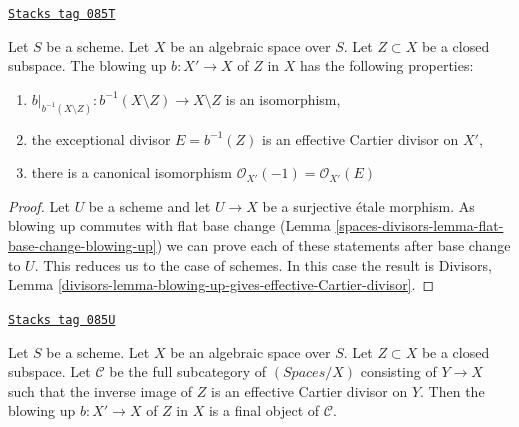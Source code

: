 \begin{lemma}
\label{spaces-divisors-lemma-blowing-up-gives-effective-Cartier-divisor}
\href{https://stacks.math.columbia.edu/tag/085T}{\texttt{Stacks tag 085T}}

Let $S$ be a scheme. Let $X$ be an algebraic space over $S$.
Let $Z \subset X$ be a closed subspace.
The blowing up $b : X' \to X$ of $Z$ in $X$
has the following properties:
\begin{enumerate}
\item $b|_{b^{-1}(X \setminus Z)} : b^{-1}(X \setminus Z) \to X \setminus Z$
is an isomorphism,
\item the exceptional divisor $E = b^{-1}(Z)$ is an effective Cartier divisor
on $X'$,
\item there is a canonical isomorphism
$\mathcal{O}_{X'}(-1) = \mathcal{O}_{X'}(E)$
\end{enumerate}
\end{lemma}

\begin{proof}
Let $U$ be a scheme and let $U \to X$ be a surjective \'etale morphism.
As blowing up commutes with flat base change
(Lemma \ref{spaces-divisors-lemma-flat-base-change-blowing-up})
we can prove each of these statements after base change to $U$.
This reduces us to the case of schemes.
In this case the result is
Divisors, Lemma
\ref{divisors-lemma-blowing-up-gives-effective-Cartier-divisor}.
\end{proof}

\begin{lemma}
\label{spaces-divisors-lemma-universal-property-blowing-up}
\href{https://stacks.math.columbia.edu/tag/085U}{\texttt{Stacks tag 085U}}


Let $S$ be a scheme.
Let $X$ be an algebraic space over $S$.
Let $Z \subset X$ be a closed subspace.
Let $\mathcal{C}$ be the full subcategory of $(\textit{Spaces}/X)$ consisting
of $Y \to X$ such that the inverse image of $Z$ is an effective
Cartier divisor on $Y$. Then the blowing up $b : X' \to X$ of $Z$ in $X$
is a final object of $\mathcal{C}$.
\end{lemma}

